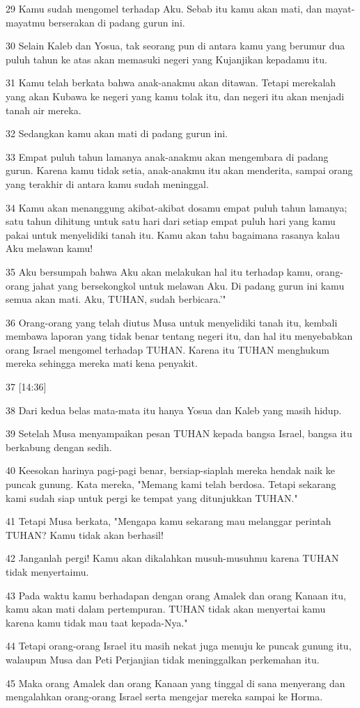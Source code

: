 \par 29 Kamu sudah mengomel terhadap Aku. Sebab itu kamu akan mati, dan mayat-mayatmu berserakan di padang gurun ini.
\par 30 Selain Kaleb dan Yosua, tak seorang pun di antara kamu yang berumur dua puluh tahun ke atas akan memasuki negeri yang Kujanjikan kepadamu itu.
\par 31 Kamu telah berkata bahwa anak-anakmu akan ditawan. Tetapi merekalah yang akan Kubawa ke negeri yang kamu tolak itu, dan negeri itu akan menjadi tanah air mereka.
\par 32 Sedangkan kamu akan mati di padang gurun ini.
\par 33 Empat puluh tahun lamanya anak-anakmu akan mengembara di padang gurun. Karena kamu tidak setia, anak-anakmu itu akan menderita, sampai orang yang terakhir di antara kamu sudah meninggal.
\par 34 Kamu akan menanggung akibat-akibat dosamu empat puluh tahun lamanya; satu tahun dihitung untuk satu hari dari setiap empat puluh hari yang kamu pakai untuk menyelidiki tanah itu. Kamu akan tahu bagaimana rasanya kalau Aku melawan kamu!
\par 35 Aku bersumpah bahwa Aku akan melakukan hal itu terhadap kamu, orang-orang jahat yang bersekongkol untuk melawan Aku. Di padang gurun ini kamu semua akan mati. Aku, TUHAN, sudah berbicara.'"
\par 36 Orang-orang yang telah diutus Musa untuk menyelidiki tanah itu, kembali membawa laporan yang tidak benar tentang negeri itu, dan hal itu menyebabkan orang Israel mengomel terhadap TUHAN. Karena itu TUHAN menghukum mereka sehingga mereka mati kena penyakit.
\par 37 [14:36]
\par 38 Dari kedua belas mata-mata itu hanya Yosua dan Kaleb yang masih hidup.
\par 39 Setelah Musa menyampaikan pesan TUHAN kepada bangsa Israel, bangsa itu berkabung dengan sedih.
\par 40 Keesokan harinya pagi-pagi benar, bersiap-siaplah mereka hendak naik ke puncak gunung. Kata mereka, "Memang kami telah berdosa. Tetapi sekarang kami sudah siap untuk pergi ke tempat yang ditunjukkan TUHAN."
\par 41 Tetapi Musa berkata, "Mengapa kamu sekarang mau melanggar perintah TUHAN? Kamu tidak akan berhasil!
\par 42 Janganlah pergi! Kamu akan dikalahkan musuh-musuhmu karena TUHAN tidak menyertaimu.
\par 43 Pada waktu kamu berhadapan dengan orang Amalek dan orang Kanaan itu, kamu akan mati dalam pertempuran. TUHAN tidak akan menyertai kamu karena kamu tidak mau taat kepada-Nya."
\par 44 Tetapi orang-orang Israel itu masih nekat juga menuju ke puncak gunung itu, walaupun Musa dan Peti Perjanjian tidak meninggalkan perkemahan itu.
\par 45 Maka orang Amalek dan orang Kanaan yang tinggal di sana menyerang dan mengalahkan orang-orang Israel serta mengejar mereka sampai ke Horma.


